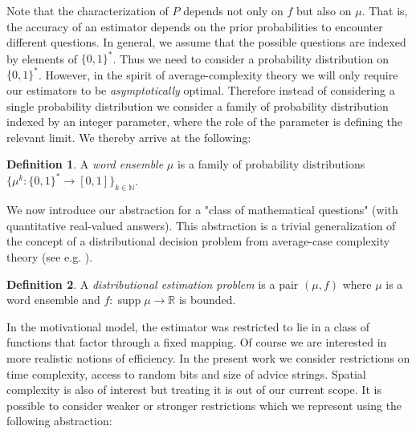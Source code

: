 \documentclass{article}
\numberwithin{equation}{section}
\theoremstyle{definition}
\newtheorem{definition}{Definition}[section]
\theoremstyle{plain}
\newcommand{\Words}{{\{ 0, 1 \}^*}}
\DeclareMathOperator{\Supp}{supp}
\newcommand{\Nats}{\mathbb{N}}
\newcommand{\Reals}{\mathbb{R}}
\begin{document}
Note that the characterization of $P$ depends not only on $f$ but also on $\mu$. That is, the accuracy of an estimator depends on the prior probabilities to encounter different questions. In general, we assume that the possible questions are indexed by elements of $\Words$. Thus we need to consider a probability distribution on $\Words$. However, in the spirit of average-complexity theory we will only require our estimators to be \emph{asymptotically} optimal. Therefore instead of considering a single probability distribution we consider a family of probability distribution indexed by an integer parameter, where the role of the parameter is defining the relevant limit. We thereby arrive at the following:

\begin{definition}

A \emph{word ensemble} $\mu$ is a family of probability distributions $\{\mu^k: \Words \rightarrow [0,1]\}_{k \in \Nats}$.

\end{definition}

We now introduce our abstraction for a "class of mathematical questions" (with quantitative real-valued answers). This abstraction is a trivial generalization of the concept of a distributional decision problem from average-case complexity theory (see e.g. \cite{Bogdanov_2006}).

\begin{definition}

A \emph{distributional estimation problem} is a pair $(\mu,f)$ where $\mu$ is a word ensemble and $f: \Supp \mu \rightarrow \Reals$ is bounded.

\end{definition}

In the motivational model, the estimator was restricted to lie in a class of functions that factor through a fixed mapping. Of course we are interested in more realistic notions of efficiency. In the present work we consider restrictions on time complexity, access to random bits and size of advice strings. Spatial complexity is also of interest but treating it is out of our current scope. It is possible to consider weaker or stronger restrictions which we represent using the following abstraction:
\end{document}
